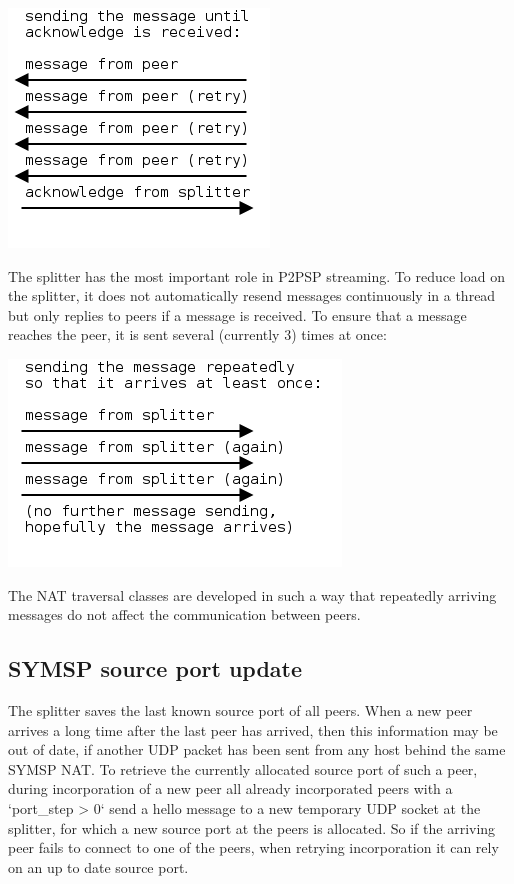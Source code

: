 \documentclass{article}
\begin{document}
\begin{center}
\includegraphics{images/acknowledge_message.png}
\end{center}

The splitter has the most important role in P2PSP streaming. To reduce
load on the splitter, it does not automatically resend messages
continuously in a thread but only replies to peers if a message is
received. To ensure that a message reaches the peer, it is sent
several (currently 3) times at once:

\begin{center}
\includegraphics{images/message_from_splitter.png}
\end{center}

The NAT traversal classes are developed in such a way that repeatedly
arriving messages do not affect the communication between peers.

\subsection{SYMSP source port update}

The splitter saves the last known source port of all peers. When a new
peer arrives a long time after the last peer has arrived, then this
information may be out of date, if another UDP packet has been sent
from any host behind the same SYMSP NAT. To retrieve the currently
allocated source port of such a peer, during incorporation of a new
peer all already incorporated peers with a `port_step > 0` send a
hello message to a new temporary UDP socket at the splitter, for which
a new source port at the peers is allocated. So if the arriving peer
fails to connect to one of the peers, when retrying incorporation it
can rely on an up to date source port.
\end{document}
